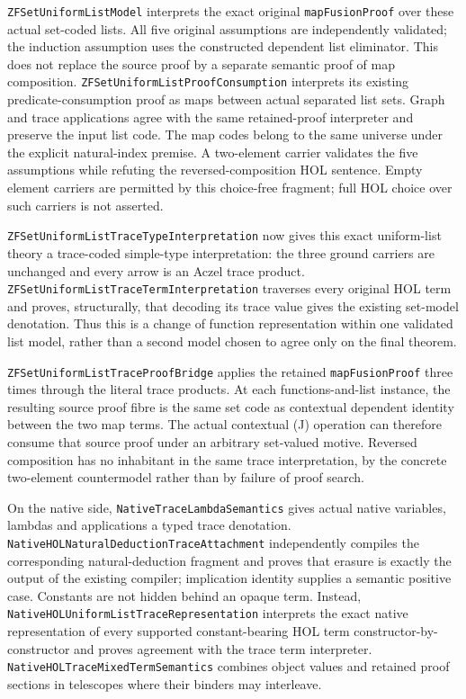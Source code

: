 \documentclass[11pt]{article}
\theoremstyle{definition}
\theoremstyle{remark}
\begin{document}
\nolinkurl{ZFSetUniformListModel} interprets the exact original
\nolinkurl{mapFusionProof} over these actual set-coded lists. All five
original assumptions are independently validated; the induction assumption
uses the constructed dependent list eliminator. This does not replace
the source proof by a separate semantic proof of map composition.
\nolinkurl{ZFSetUniformListProofConsumption} interprets its existing
predicate-consumption proof as maps between actual separated list sets.
Graph and trace applications agree with the same retained-proof interpreter
and preserve the input list code. The map codes belong to the same
universe under the explicit natural-index premise. A two-element carrier
validates the five assumptions while refuting the reversed-composition
HOL sentence. Empty element carriers are permitted by this choice-free
fragment; full HOL choice over such carriers is not asserted.

\nolinkurl{ZFSetUniformListTraceTypeInterpretation} now gives this exact
uniform-list theory a trace-coded simple-type interpretation: the three
ground carriers are unchanged and every arrow is an Aczel trace product.
\nolinkurl{ZFSetUniformListTraceTermInterpretation} traverses every original
HOL term and proves, structurally, that decoding its trace value gives the
existing set-model denotation. Thus this is a change of function
representation within one validated list model, rather than a second model
chosen to agree only on the final theorem.

\nolinkurl{ZFSetUniformListTraceProofBridge} applies the retained
\nolinkurl{mapFusionProof} three times through the literal trace products.
At each functions-and-list instance, the resulting source proof fibre is
the same set code as contextual dependent identity between the two map
terms. The actual contextual (J) operation can therefore consume that
source proof under an arbitrary set-valued motive. Reversed composition has
no inhabitant in the same trace interpretation, by the concrete two-element
countermodel rather than by failure of proof search.

On the native side, \nolinkurl{NativeTraceLambdaSemantics} gives actual
native variables, lambdas and applications a typed trace denotation.
\nolinkurl{NativeHOLNaturalDeductionTraceAttachment} independently compiles
the corresponding natural-deduction fragment and proves that erasure is
exactly the output of the existing compiler; implication identity supplies
a semantic positive case. Constants are not hidden behind an opaque term.
Instead, \nolinkurl{NativeHOLUniformListTraceRepresentation} interprets the
exact native representation of every supported constant-bearing HOL term
constructor-by-constructor and proves agreement with the trace term
interpreter. \nolinkurl{NativeHOLTraceMixedTermSemantics} combines object
values and retained proof sections in telescopes where their binders may
interleave.
\end{document}
